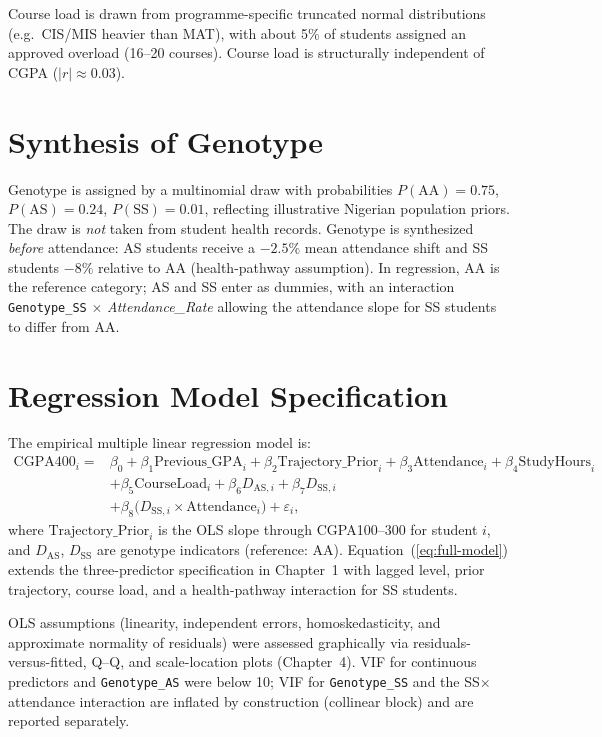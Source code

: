 \documentclass[12pt]{report}
\begin{document}
	Course load is drawn from programme-specific truncated normal distributions (e.g.\ CIS/MIS heavier than MAT), with about 5\% of students assigned an approved overload (16--20 courses). Course load is structurally independent of CGPA ($|r| \approx 0.03$).
	
	\section{Synthesis of Genotype}
	\label{sec:genotype-synth}
	Genotype is assigned by a multinomial draw with probabilities $P(\text{AA}) = 0.75$, $P(\text{AS}) = 0.24$, $P(\text{SS}) = 0.01$, reflecting illustrative Nigerian population priors. The draw is \textit{not} taken from student health records. Genotype is synthesized \textit{before} attendance: AS students receive a $-2.5\%$ mean attendance shift and SS students $-8\%$ relative to AA (health-pathway assumption). In regression, AA is the reference category; AS and SS enter as dummies, with an interaction \texttt{Genotype\_SS} $\times$ \textit{Attendance\_Rate} allowing the attendance slope for SS students to differ from AA.
	
	\section{Regression Model Specification}
	The empirical multiple linear regression model is:
	\begin{equation}
		\begin{split}
			\text{CGPA400}_i ={} & \beta_0 + \beta_1 \text{Previous\_GPA}_i
				+ \beta_2 \text{Trajectory\_Prior}_i
				+ \beta_3 \text{Attendance}_i + \beta_4 \text{StudyHours}_i \\
			& + \beta_5 \text{CourseLoad}_i + \beta_6 D_{\text{AS},i}
				+ \beta_7 D_{\text{SS},i} \\
			& + \beta_8 \bigl(D_{\text{SS},i} \times \text{Attendance}_i\bigr)
				+ \varepsilon_i,
		\end{split}
		\label{eq:full-model}
	\end{equation}
	where $\text{Trajectory\_Prior}_i$ is the OLS slope through CGPA100--300 for student $i$, and $D_{\text{AS}}$, $D_{\text{SS}}$ are genotype indicators (reference: AA). Equation~(\ref{eq:full-model}) extends the three-predictor specification in Chapter~1 with lagged level, prior trajectory, course load, and a health-pathway interaction for SS students.
	
	OLS assumptions (linearity, independent errors, homoskedasticity, and approximate normality of residuals) were assessed graphically via residuals-versus-fitted, Q--Q, and scale-location plots (Chapter~4). VIF for continuous predictors and \texttt{Genotype\_AS} were below 10; VIF for \texttt{Genotype\_SS} and the SS$\times$attendance interaction are inflated by construction (collinear block) and are reported separately.
	
\end{document}
